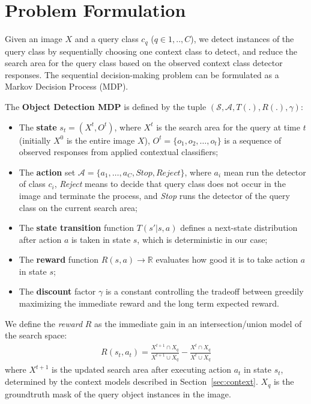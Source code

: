 \section{Problem Formulation}
Given an image $X$ and a query class $c_q$ ($q \in {1,..,C}$), we detect instances of
the query class by sequentially choosing one
context class to detect, and reduce the search area for the query class based on
the observed context class detector responses. 
The sequential decision-making problem can be formulated as a Markov Decision
Process (MDP).
\begin{mydef}
The \textbf{Object Detection MDP} is defined by the tuple $(\mathcal{S}, \mathcal{A}, T(.), R(.), \gamma)$:
\begin{itemize}[itemsep=-2pt]
\item The \textbf{state} $s_t=(X^t, O^t)$, where $X^t$ is the search area for the
query at time $t$ (initially $X^0$ is the entire image $X$), $O^t= \{o_1, o_2,
\dots, o_t\}$ is a sequence of observed responses from applied contextual
classifiers;
\item The \textbf{action} set $\mathcal{A} = \{a_1, \dots, a_C, Stop,
Reject\}$, where $a_i$ mean run the detector of class
$c_i$, \textit{Reject} means to decide that query class does not occur in the
image and terminate the process, and \textit{Stop} runs the detector of the query class on the current search area;
\item The \textbf{state transition} function $T(s'|s,a)$ defines a
next-state distribution after action $a$ is taken in state $s$, which is deterministic in our case;
\item The \textbf{reward} function $R(s,a) \rightarrow \mathbb{R}$ evaluates
how good it is to take action $a$ in state $s$;
\item The \textbf{discount} factor $\gamma$ is a constant controlling
the tradeoff between greedily maximizing the immediate
reward and the long term expected reward.
\end{itemize}
\end{mydef}

We define the \textit{reward} $R$ as the immediate gain in an intersection/union model of the search space:
\begin{eqnarray}
\label{eq:imreward}
R(s_t,a_t) =  \frac{X^{t+1} \cap X_q}{X^{t+1} \cup X_q} - \frac{X^{t}\cap X_q}{X^{t} \cup X_q}
\end{eqnarray}
where $X^{t+1}$ is the updated search area after executing action $a_t$ in state $s_t$, determined by the context models described in Section~\ref{sec:context}. $X_q$ is the groundtruth mask of the query object instances in the image. 

